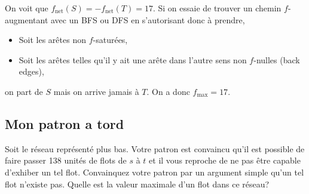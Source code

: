 \begin{solution}
  On voit que $f_\mathrm{net}(S) = -f_\mathrm{net}(T) = 17$.
  Si on essaie de trouver un chemin $f$-augmentant avec un BFS ou DFS
  en s'autorisant donc à prendre,
  \begin{itemize}
    \item Soit les arêtes non $f$-saturées,
    \item Soit les arêtes telles qu'il y ait une arête dans l'autre
      sens non $f$-nulles (back edges),
  \end{itemize}
  on part de $S$ mais on arrive jamais à $T$.
  On a donc $f_\mathrm{max} = 17$.
  \begin{center}
  \end{center}
\end{solution}


\subsection{Mon patron a tord}
Soit le réseau représenté plus bas. Votre patron est convaincu qu'il est possible de faire passer 138 unités de flots de $s$ à $t$ et il vous reproche de ne pas être capable d'exhiber un tel flot. Convainquez votre patron par un argument simple qu'un tel flot n'existe pas. Quelle est la valeur maximale d'un flot dans ce réseau? 

